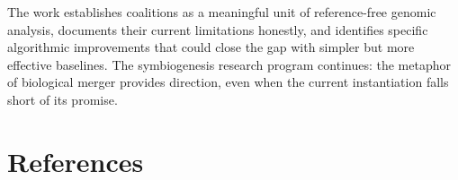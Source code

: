 \documentclass{../yalumba}
\begin{document}
The work establishes coalitions as a meaningful unit of reference-free
genomic analysis, documents their current limitations honestly, and
identifies specific algorithmic improvements that could close the gap
with simpler but more effective baselines.  The symbiogenesis research
program continues: the metaphor of biological merger provides direction,
even when the current instantiation falls short of its promise.


\section*{References}
\label{sec:references}

\begingroup
\renewcommand{\section}[2]{}%


\endgroup
\end{document}
